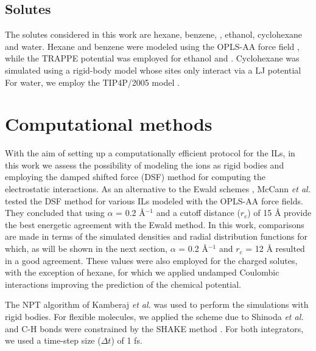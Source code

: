 \documentclass[3p,twocolumn]{elsarticle}
\begin{document}
\subsection{Solutes}
\label{sec:force_field_sol}

The solutes considered in this work are hexane, benzene, , ethanol, cyclohexane and water.
Hexane and benzene were modeled using the OPLS-AA force field \cite{Jorgensen_1996}, while the TRAPPE potential \cite{Chen_2001,Potoff_2001} was employed for ethanol and .
Cyclohexane was simulated using a rigid-body model \cite{munoz2015lennard} whose sites only interact via a LJ potential
For water, we employ the TIP4P/2005 model \cite{Abascal_2005,Vega_2011}. 

\section{Computational methods}
\label{sec:sim_details}

With the aim of setting up a computationally efficient protocol for the ILs, in this work we assess the possibility of modeling the ions as rigid bodies and employing the damped shifted force (DSF) method \cite{Fennell2006} for computing the electrostatic interactions.
As an alternative to the Ewald schemes \cite{Ewald_1921,Darden_1993,Hockney_1988}, McCann \textit{et al.} \cite{McCann_2013} tested the DSF method for various ILs modeled with the OPLS-AA force fields.
They concluded that using $\alpha$ = 0.2 {\AA}$^{-1}$ and a cutoff distance ($r_c$) of 15 {\AA} provide the best energetic agreement with the Ewald method.
In this work, comparisons are made in terms of the simulated densities and radial distribution functions for which, as will be shown in the next section, $\alpha$ = 0.2 {\AA}$^{-1}$ and $r_c$ = 12 {\AA} resulted in a good agreement.
These values were also employed for the charged solutes, with the exception of hexane, for which we applied undamped Coulombic interactions improving the prediction of the chemical potential.

The NPT algorithm of Kamberaj \textit{et al.} \cite{Kamberaj_2005} was used to perform the simulations with rigid bodies.
For flexible molecules, we applied the scheme due to Shinoda \textit{et al.} \cite{Shinoda2004} and C-H bonds were constrained by the SHAKE method \cite{Ryckaert1977}.
For both integrators, we used a time-step size ($\Delta t$) of 1 fs.
\end{document}
